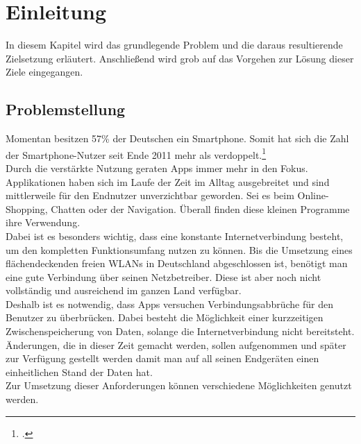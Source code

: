\chapter{Einleitung}
\label{cha:einleitung}
In diesem Kapitel wird das grundlegende Problem und die daraus resultierende Zielsetzung erläutert. Anschließend wird grob auf das Vorgehen zur Lösung dieser Ziele eingegangen.

\section{Problemstellung}
\label{sec:problemstellung}
Momentan besitzen 57\% der Deutschen ein Smartphone. Somit hat sich die Zahl der Smartphone-Nutzer seit Ende 2011 mehr als verdoppelt.\footcite{Statista-SmartphoneNutzung}\\
Durch die verstärkte Nutzung geraten \glspl{App} immer mehr in den Fokus. Applikationen haben sich im Laufe der Zeit im Alltag ausgebreitet und sind mittlerweile für den Endnutzer unverzichtbar geworden. Sei es beim Online-Shopping, Chatten oder der Navigation. Überall finden diese kleinen Programme ihre Verwendung.\\
Dabei ist es besonders wichtig, dass eine konstante Internetverbindung besteht, um den kompletten Funktionsumfang nutzen zu können. Bis die Umsetzung eines flächendeckenden freien WLANs in Deutschland abgeschlossen ist, benötigt man eine gute Verbindung über seinen Netzbetreiber. Diese ist aber noch nicht vollständig und ausreichend im ganzen Land verfügbar.\\
Deshalb ist es notwendig, dass Apps versuchen Verbindungsabbrüche für den Benutzer zu überbrücken. Dabei besteht die Möglichkeit einer kurzzeitigen Zwischenspeicherung von Daten, solange die Internetverbindung nicht bereitsteht. Änderungen, die in dieser Zeit gemacht werden, sollen aufgenommen und später zur Verfügung gestellt werden damit man auf all seinen Endgeräten einen einheitlichen Stand der Daten hat.\\
Zur Umsetzung dieser Anforderungen können verschiedene Möglichkeiten genutzt werden.
